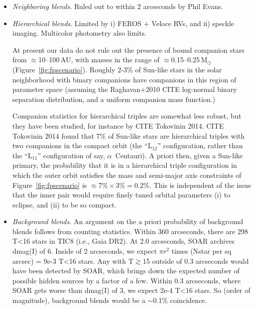 \documentclass[12pt,twocolumn,tighten]{aastex62}
\begin{document}
\begin{itemize}
  \item {\it Neighboring blends}.
    Ruled out to within 2 arcseconds by Phil Evans.

  \item {\it Hierarchical blends}.
    Limited by i) FEROS + Veloce RVs, and ii) speckle imaging. 
    Multicolor photometry also limits.

  At present our data do not rule out the presence of bound companion
    stars from $\approx$10--100$\,$AU, with masses in the range of
    $\approx$0.15--0.25$\,$M$_\odot$ (Figure~\ref{fig:fpscenario}).
  Roughly 2-3\% of Sun-like stars in the solar neighborhood with
    binary companions have companions in this region of parameter space
  (assuming the Raghavan+2010 CITE log-normal binary
    separation distribution, and a uniform companion mass function.)

  Companion statistics for hierarchical triples are somewhat less 
    robust, but they have been studied, for instance by CITE
    Tokovinin 2014.
  CITE Tokovinin 2014 found that 7\% of Sun-like stars are
    hierarchical triples with two companions in the compact orbit (the
    ``L$_{12}$'' configuration, rather than the ``L$_{11}$''
    configuration of say, $\alpha$~Centauri).
  A priori then, given a Sun-like primary, the probability that it is in a
    hierarchical triple configuration in which the outer orbit
    satisfies the mass and semi-major axis constraints of
    Figure~\ref{fig:fpscenario} is $\approx 7\% \times 3\% = 0.2\%$. 
  This is independent of the issue that the inner pair would require
    finely tuned orbital parameters (i) to eclipse, and (ii) to
    be so compact.

		

  \item {\it Background blends}.
	An argument on the a priori probability of background blends follows from
	counting statistics. Within 360 arcseconds, there are 298 T<16 stars in TIC8
	(i.e., Gaia DR2). At 2.0 arcseconds, SOAR archives dmag(I) of 6. Inside of 2
	arcseconds, we expect $\pi r^2 $ times (Nstar per sq arcsec) = 9e-3 T<16 stars.
	Any with T$\gtrsim$15 outside of 0.3 arcseconds would have been detected by
	SOAR, which brings down the expected number of possible hidden sources by a
	factor of a few.  Within 0.3 arcseconds, where SOAR gets worse than dmag(I) of
	3, we expect 2e-4 T<16 stars. So (order of magnitude), background blends would
	be a $\sim$0.1\% coincidence.



\end{itemize}
\end{document}

